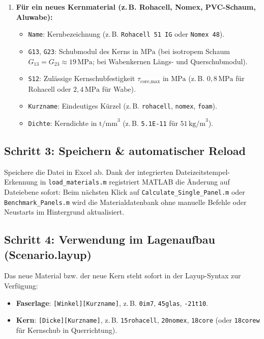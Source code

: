 \begin{enumerate}
    \item \textbf{Für ein neues Kernmaterial (z.\,B. Rohacell, Nomex, PVC-Schaum, Aluwabe):}
    \begin{itemize}
        \item \texttt{Name}: Kernbezeichnung (z.\,B. \texttt{Rohacell 51 IG} oder \texttt{Nomex 48}).
        \item \texttt{G13}, \texttt{G23}: Schubmodul des Kerns in $\text{MPa}$ (bei isotropem Schaum $G_{13} = G_{23} \approx 19\,\text{MPa}$; bei Wabenkernen Längs- und Querschubmodul).
        \item \texttt{S12}: Zulässige Kernschubfestigkeit $\tau_{\text{core,max}}$ in $\text{MPa}$ (z.\,B. $0{,}8\,\text{MPa}$ für Rohacell oder $2{,}4\,\text{MPa}$ für Wabe).
        \item \texttt{Kurzname}: Eindeutiges Kürzel (z.\,B. \texttt{rohacell}, \texttt{nomex}, \texttt{foam}).
        \item \texttt{Dichte}: Kerndichte in $\text{t/mm}^3$ (z.\,B. \texttt{5.1E-11} für $51\,\text{kg/m}^3$).
    \end{itemize}
\end{enumerate}

\subsection*{Schritt 3: Speichern \& automatischer Reload}
Speichere die Datei in Excel ab. Dank der integrierten Dateizeitstempel-Erkennung in \texttt{load\_materials.m} registriert MATLAB die Änderung auf Dateiebene sofort: Beim nächsten Klick auf \texttt{Calculate\_Single\_Panel.m} oder \texttt{Benchmark\_Panels.m} wird die Materialdatenbank ohne manuelle Befehle oder Neustarts im Hintergrund aktualisiert.

\subsection*{Schritt 4: Verwendung im Lagenaufbau (Scenario.layup)}
Das neue Material bzw. der neue Kern steht sofort in der Layup-Syntax zur Verfügung:
\begin{itemize}
    \item \textbf{Faserlage}: \texttt{[Winkel][Kurzname]}, z.\,B. \texttt{0im7}, \texttt{45glas}, \texttt{-21t10}.
    \item \textbf{Kern}: \texttt{[Dicke][Kurzname]}, z.\,B. \texttt{15rohacell}, \texttt{20nomex}, \texttt{18core} (oder \texttt{18corew} für Kernschub in Querrichtung).
\end{itemize}

